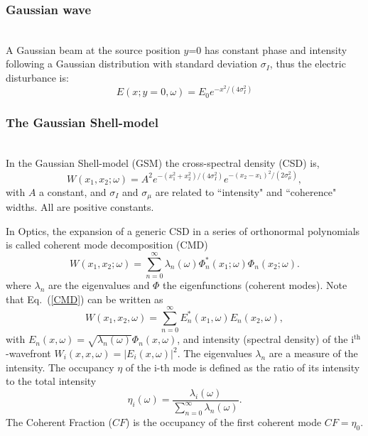 \documentclass{iopconfser}
\begin{document}
\subsubsection{Gaussian wave}\hspace*{\fill} \\
A Gaussian beam at the source position $y$=0 has constant phase and intensity following a Gaussian distribution with standard deviation $\sigma_I$, thus the electric disturbance is: 
\begin{equation}
\label{eq:gaussianSource}
    E(x;y=0,\omega) = E_0 e^{-x^2 / (4 \sigma_I^2)}
\end{equation}

\subsubsection{The Gaussian Shell-model}\hspace*{\fill} \\
In the Gaussian Shell-model (GSM) the cross-spectral density (CSD) is, 
\begin{equation}
W(x_1,x_2;\omega) = A^2 e^{-(x_1^2+x_2^2)/(4 \sigma_I^2)} e^{-(x_2-x_1)^2/(2 \sigma_{\mu}^2)},
\label{GS_CSD}
\end{equation} 
with $A$ a constant, and $\sigma_I$ and $\sigma_\mu$ are related to ``intensity" and  ``coherence" widths. All are positive constants. 

In Optics, the expansion of a generic CSD in a series of orthonormal polynomials is called coherent mode decomposition (CMD)  
\cite{mandel_wolf}
\begin{equation}
W(x_1,x_2;\omega) = \sum_{n=0}^{\infty} \lambda_n(\omega) \Phi_n^*(x_1;\omega) \Phi_n(x_2;\omega). 
\label{CMD}
\end{equation}
where $\lambda_n$ are the eigenvalues and $\Phi$ the eigenfunctions (coherent modes). 
Note that Eq.~(\ref{CMD}) can be written as 
\begin{equation}
W(x_1,x_2,\omega) = \sum_{n=0}^{\infty} E_n^*(x_1,\omega) E_n(x_2,\omega), 
\end{equation} with $E_n(x, \omega) = \sqrt{\lambda_n(\omega)} \Phi_n(x,\omega)$, and intensity (spectral density) of the i$^\text{th}$-wavefront $W_i(x, x, \omega) =  |E_i(x, \omega)|^2$.
The eigenvalues $\lambda_n$ are a measure of the intensity.
The occupancy $\eta$ of the i-th mode is defined as the ratio of its intensity to the total intensity 
\begin{equation}
\eta_i(\omega) = \frac{\lambda_i(\omega)}{\sum_{n=0}^{\infty} \lambda_n(\omega)}.
\end{equation}
The Coherent Fraction ($CF$) is the occupancy of the first coherent mode $CF=\eta_0$.
\end{document}
